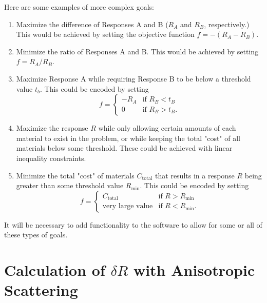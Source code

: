 Here are some examples of more complex goals:
\begin{enumerate}
\item Maximize the difference of Responses A and B ($R_A$ and $R_B$, respectively.)
      This would be achieved by setting the objective function $f = -\left(R_A - R_B\right)$.
\item Minimize the ratio of Responses A and B.
      This would be achieved by setting $f = R_A/R_B$.
\item Maximize Response A while requiring Response B to be below a threshold value $t_b$.
      This could be encoded by setting \[f = \begin{cases} -R_A & \text{if } R_B < t_B \\ 0 & \text{if } R_B > t_B. \end{cases}\]
\item Maximize the response $R$ while only allowing certain amounts of each material to exist in the problem, or while keeping the total "cost" of all materials below some threshold.
      These could be achieved with linear inequality constraints.
\item Minimize the total "cost" of materials $C_\text{total}$ that results in a response $R$ being greater than some threshold value $R_\text{min}$.
      This could be encoded by setting \[f = \begin{cases} C_\text{total} & \text{if } R > R_\text{min} \\ \text{very large value} & \text{if } R < R_\text{min}. \end{cases}\]
\end{enumerate}

It will be necessary to add functionality to the software to allow for some or all of these types of goals.


\section{Calculation of $\delta R$ with Anisotropic Scattering}
\label{sec:proposal:anisotropic_scattering}


